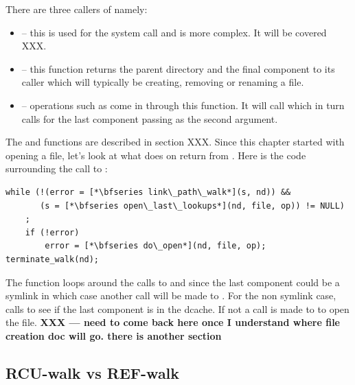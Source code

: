 There are three callers of  namely:

\begin{itemize}
	\item {} --  this is used for the  system call and is more complex. It will be covered XXX.
	\item {} -- this function returns the parent directory and the final component to its caller which will 
		typically be creating, removing or renaming a file.
	\item {} -- operations such as  come in through this function. It will call 
		which in turn calls  for the last component passing  as the second argument.
\end{itemize}

\noindent
The   and  functions are described in section XXX. Since this chapter started with opening a file, let's look at what  does on return from . Here is the code surrounding the call to :

\begin{lstlisting}
while (!(error = [*\bfseries link\_path\_walk*](s, nd)) &&
       (s = [*\bfseries open\_last\_lookups*](nd, file, op)) != NULL)
    ;
    if (!error)
        error = [*\bfseries do\_open*](nd, file, op);
terminate_walk(nd);
\end{lstlisting}

\noindent
The function loops around the calls to  and  since the last component could be a symlink in which case another call will be made to . For the non symlink case,  calls  to see if the last component is in the dcache. If not a call is made to  to open the file. \textbf{XXX --- need to come back here once I understand where file creation doc will go. there is another section}


\subsection{RCU-walk vs REF-walk}

